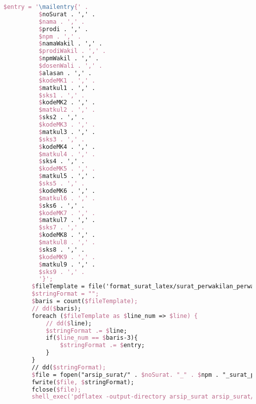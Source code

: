 \begin{lstlisting}[language=tex,basicstyle=\tiny,caption=HistorysuratController.php]
        $entry = '\mailentry{' .
          $noSurat . ',' .
          $nama . ',' .
          $prodi . ',' .
          $npm . ',' .
          $namaWakil . ',' .
          $prodiWakil . ',' .
          $npmWakil . ',' .
          $dosenWali . ',' .
          $alasan . ',' .
          $kodeMK1 . ',' .
          $matkul1 . ',' .
          $sks1 . ',' .
          $kodeMK2 . ',' .
          $matkul2 . ',' .
          $sks2 . ',' .
          $kodeMK3 . ',' .
          $matkul3 . ',' .
          $sks3 . ',' .
          $kodeMK4 . ',' .
          $matkul4 . ',' .
          $sks4 . ',' .
          $kodeMK5 . ',' .
          $matkul5 . ',' .
          $sks5 . ',' .
          $kodeMK6 . ',' .
          $matkul6 . ',' .
          $sks6 . ',' .
          $kodeMK7 . ',' .
          $matkul7 . ',' .
          $sks7 . ',' .
          $kodeMK8 . ',' .
          $matkul8 . ',' .
          $sks8 . ',' .
          $kodeMK9 . ',' .
          $matkul9 . ',' .
          $sks9 . ',' .
          '}';
        $fileTemplate = file('format_surat_latex/surat_perwakilan_perwalian_9mk.tex');
        $stringFormat = "";
        $baris = count($fileTemplate);
        // dd($baris);
        foreach ($fileTemplate as $line_num => $line) {
            // dd($line);
            $stringFormat .= $line;
            if($line_num == $baris-3){
                $stringFormat .= $entry;
            }
        }
        // dd($stringFormat);
        $file = fopen("arsip_surat/" . $noSurat. "_" . $npm . "_surat_perwakilan_perwalian_9mk.tex", "w");
        fwrite($file, $stringFormat);
        fclose($file);
        shell_exec('pdflatex -output-directory arsip_surat arsip_surat/' . $noSurat . '_' . $npm . '_surat_perwakilan_perwalian_9mk.tex');


\end{lstlisting}
